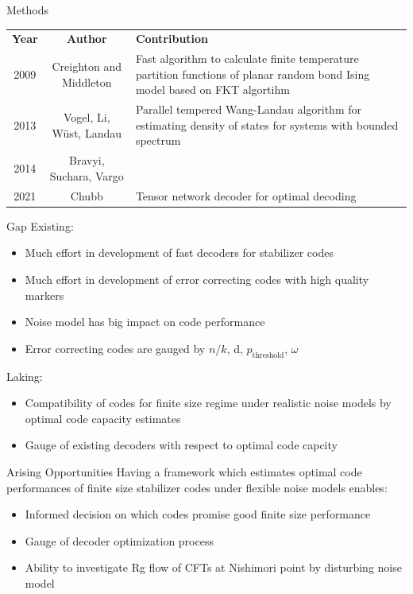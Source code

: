 \documentclass{dfki}
\begin{document}
\begin{frame}{Methods}
	\vspace{-15pt}
	\begin{table}[h]
        \renewcommand{\arraystretch}{1.5} %
        \small
		\begin{tabular}{c|c|p{7cm}}
			\textbf{Year} & \textbf{Author} & \textbf{Contribution} \\
			2009 & Creighton and Middleton \cite{thomas_exact_2009,thomas_numerically_2013} & Fast algorithm to calculate finite temperature partition functions of planar random bond Ising model based on FKT algortihm \cite{kasteleyn_statistics_1961,temperley_dimer_1961} \\
			2013 & Vogel, Li, Wüst, Landau \cite{vogel_generic_2013} & Parallel tempered Wang-Landau algorithm \cite{wang_efficient_2001} for estimating density of states for systems with bounded spectrum \\
			2014 & Bravyi, Suchara, Vargo \cite{bravyi_efficient_2014} & \\
			2021 & Chubb & Tensor network decoder for optimal decoding
		\end{tabular}
	\end{table}
\end{frame}

\begin{frame}{Gap}
	Existing:
	\begin{itemize}
		\item Much effort in development of fast decoders for stabilizer codes
		\item Much effort in development of error correcting codes with high quality markers
		\item Noise model has big impact on code performance
		\item Error correcting codes are gauged by $n/k$, d, $p_{\text{threshold}}$, $\omega$
	\end{itemize}
	Laking:
	\begin{itemize}
		\item Compatibility of codes for finite size regime under realistic noise models by optimal code capacity estimates
		\item Gauge of existing decoders with respect to optimal code capcity
	\end{itemize}

\end{frame}
\begin{frame}{Arising Opportunities}
	Having a framework which estimates optimal code performances of finite size stabilizer codes under flexible noise models enables:
	\begin{itemize}
		\item Informed decision on which codes promise good finite size performance
		\item Gauge of decoder optimization process
		\item Ability to investigate Rg flow of CFTs at Nishimori point by disturbing noise model
	\end{itemize}
\end{frame}
\end{document}
